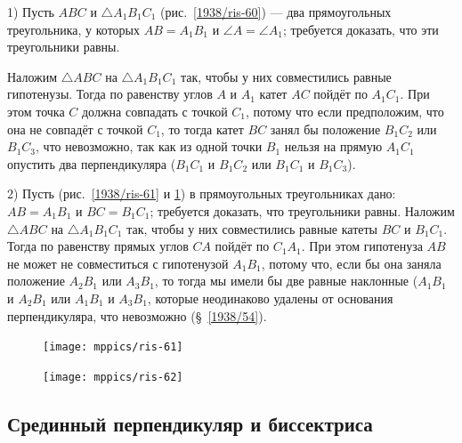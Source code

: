 \documentclass[twoside]{book}
\begin{document}
1) Пусть $ABC$ и $\triangle A_1B_1C_1$ (рис.~\ref{1938/ris-60}) — два прямоугольных треугольника, у которых $AB=A_1B_1$ и $\angle A = \angle A_1$;
требуется доказать, что эти треугольники равны.

Наложим $\triangle ABC$ на $\triangle A_1B_1C_1$ так, чтобы у них совместились равные гипотенузы.
Тогда по равенству углов $A$ и $A_1$ катет $AC$ пойдёт по $A_1C_1$.
При этом точка $C$ должна совпадать с точкой $C_1$, потому что если предположим, что она не совпадёт с точкой $C_1$, то тогда катет $BC$ занял бы положение $B_1C_2$ или $B_1C_3$, что невозможно, так как из одной точки $B_1$ нельзя на прямую $A_1C_1$ опустить два перпендикуляра ($B_1C_1$ и $B_1C_2$ или $B_1C_1$ и $B_1C_3$).


2) Пусть (рис.~\ref{1938/ris-61} и \ref{1938/ris-62}) в прямоугольных треугольниках дано:
$AB=A_1B_1$ и $BC=B_1C_1$;
требуется доказать, что треугольники равны.
Наложим $\triangle ABC$ на $\triangle A_1B_1C_1$ так, чтобы у них совместились равные катеты $BC$ и $B_1C_1$.
Тогда по равенству прямых углов $CA$ пойдёт по $C_1A_1$.
При этом гипотенуза $AB$ не может не совместиться с гипотенузой $A_1B_1$, потому что, если бы она заняла положение $A_2B_1$ или $A_3B_1$, то тогда мы имели бы две равные наклонные ($A_1B_1$ и $A_2B_1$ или $A_1B_1$ и $A_3B_1$, которые неодинаково удалены от основания перпендикуляра, что невозможно (§~\ref{1938/54}).

\begin{figure}[h!]
\begin{minipage}{.48\textwidth}
\centering
\texttt{[image: mppics/ris-61]}
\end{minipage}\hfill
\begin{minipage}{.48\textwidth}
\centering
\texttt{[image: mppics/ris-62]}
\end{minipage}

\medskip

\begin{minipage}{.48\textwidth}
\centering
\caption{}\label{1938/ris-61}
\end{minipage}\hfill
\begin{minipage}{.48\textwidth}
\centering
\caption{}\label{1938/ris-62}
\end{minipage}
\vskip-4mm
\end{figure}

\subsection*{Срединный перпендикуляр и биссектриса} 
\end{document}
